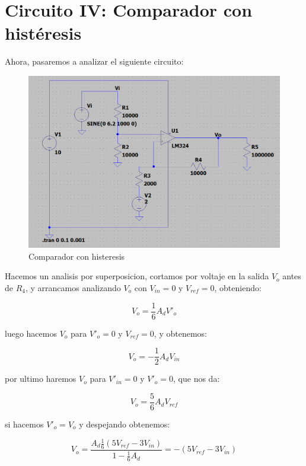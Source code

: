 \documentclass[12pt]{article}
\begin{document}
	\section{Circuito IV: Comparador con histéresis}
	Ahora, pasaremos a analizar el siguiente circuito:
	\begin{figure}[h]
		\centering
		\includegraphics[width=1\linewidth]{Simulaciones-Resultados/Circuito4_esquematico}
		\caption{Comparador con histeresis}
		\label{fig:circuito4esquematico}
	\end{figure}

	Hacemos un analisis por superposicion, cortamos por voltaje en la salida $V_{o}$ antes de $R_{4}$, y arrancamos analizando $V_{o}$ 			con $V_{in} = 0$ y $V_{ref} = 0$, obteniendo:
 	
	\begin{equation}
		V_{o} = \frac{1}{6} A_{d} V'_{o}
	\end{equation}
	
	luego hacemos $V_{o}$ para $V'_{o} = 0$ y $V_{ref} = 0$, y obtenemos:

	\begin{equation}
		V_{o} = -\frac{1}{2} A_{d} V_{in}
	\end{equation}

	por ultimo haremos $V_{o}$ para $V'_{in} = 0$ y $V'_{o} = 0$, que nos da:

	\begin{equation}
		V_{o} = \frac{5}{6} A_{d} V_{ref}
	\end{equation}

	si hacemos $V'_{o} = V_{o}$ y despejando obtenemos:

	\begin{equation}
		V_{o} = \frac{A_{d} \frac{1}{6} (5 V_{ref} - 3 V_{in})}{1 - \frac{1}{6} A_{d}} = - (5 V_{ref} - 3V_{in})
	\end{equation}
\end{document}
